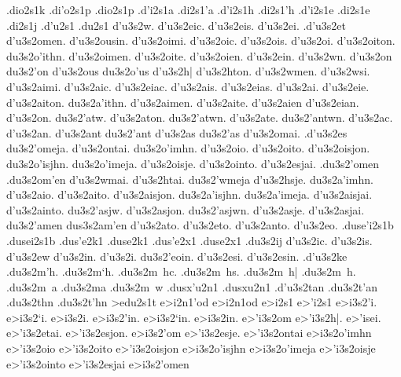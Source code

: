 {.dio2s1k
.di'o2s1p		%
.dio2s1p
.d'i2s1a       		%
.di2s1'a
.d'i2s1h   		%
.di2s1'h
.d'i2s1e   		%
.di2s1e
.di2s1j    		%
.d'u2s1    		%
.du2s1
%
	d'u3s2w.  		%
	d'u3s2eic.
	d'u3s2eis.
	d'u3s2ei.
	.d'u3s2et
	d'u3s2omen.
	d'u3s2ousin.
	d'u3s2oimi.
	d'u3s2oic.
	d'u3s2ois.
	d'u3s2oi.
	d'u3s2oiton.
	du3s2o'ithn.
	d'u3s2oimen.
	d'u3s2oite.
	d'u3s2oien.
	d'u3s2ein.
	d'u3s2wn. d'u3s2on du3s2'on  
	d'u3s2ous du3s2o'us
	d'u3s2h|
	d'u3s2hton.
	d'u3s2wmen.
	d'u3s2wsi.
	d'u3s2aimi.
	d'u3s2aic. d'u3s2eiac.
	d'u3s2ais. d'u3s2eias.
	d'u3s2ai. d'u3s2eie.
	d'u3s2aiton.
	du3s2a'ithn.
	d'u3s2aimen.
	d'u3s2aite.
	d'u3s2aien d'u3s2eian.
	d'u3s2on.
	du3s2'atw.
	d'u3s2aton.
	du3s2'atwn.
	d'u3s2ate.
	du3s2'antwn.
	d'u3s2ac. d'u3s2an. d'u3s2ant du3s2'ant
	d'u3s2as du3s2'as
	d'u3s2omai.
	.d'u3s2es
	du3s2'omeja.
	d'u3s2ontai.
	du3s2o'imhn.
	d'u3s2oio.
	d'u3s2oito.
	d'u3s2oisjon.
	du3s2o'isjhn.
	du3s2o'imeja.
	d'u3s2oisje.
	d'u3s2ointo.
	d'u3s2esjai.
	.du3s2'omen		%
	.du3s2om'en
	d'u3s2wmai.
	d'u3s2htai.
	du3s2'wmeja
	d'u3s2hsje.
	du3s2a'imhn.
	d'u3s2aio.
	d'u3s2aito.
	d'u3s2aisjon.
	du3s2a'isjhn.
	du3s2a'imeja.
	d'u3s2aisjai.
	d'u3s2ainto.
	du3s2'asjw.
	d'u3s2asjon.
	du3s2'asjwn.
	d'u3s2asje.
	d'u3s2asjai.
	du3s2'amen  		%
	dus3s2am'en
	d'u3s2ato.   		%
	d'u3s2eto.  		%
	d'u3s2anto.  		%
	d'u3s2eo. 		%
.duse'i2s1b 		%
.dusei2s1b
.dus'e2k1  		%
.duse2k1
.dus'e2x1  		%
.duse2x1
	.du3s2ij    		%
	d'u3s2ic.		%
	d'u3s2is.
	d'u3s2ew
	d'u3s2in.
	d'u3s2i.
	du3s2'eoin.
	d'u3s2esi.
	d'u3s2esin.
	.d'u3s2ke   		%
	.du3s2m'h.  		%
	.du3s2m`h.
	.du3s2m~hc.
	.du3s2m~hs.
	.du3s2m~h|
	.du3s2m~h.
	.du3s2m~a    		
	.du3s2ma   		
	.du3s2m~w
.dusx'u2n1  		%
.dusxu2n1
	.d'u3s2tan  		%
	.du3s2t'an
	.du3s2thn  		%
	.du3s2t'hn
>edu2s1t 		%
e>i2n1'od   		%
e>i2n1od
e>i2s1  		%
e>'i2s1
	e>i3s2'i.   		%
	e>i3s2`i.
	e>i3s2i.
	e>i3s2'in.
	e>i3s2`in.
	e>i3s2in.
	e>'i3s2om   		%
	e>'i3s2h|. e>'isei.
	e>'i3s2etai.
	e>'i3s2esjon.
	e>i3s2'om		%
	e>'i3s2esje.
	e>'i3s2ontai
%
	e>i3s2o'imhn
	e>'i3s2oio
	e>'i3s2oito
	e>'i3s2oisjon
	e>i3s2o'isjhn
	e>i3s2o'imeja
	e>'i3s2oisje
	e>'i3s2ointo
%
	e>'i3s2esjai
	e>i3s2'omen		%
}
